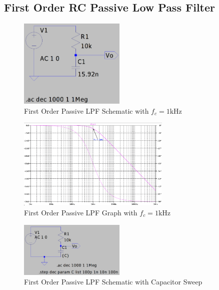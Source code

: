 \documentclass[CMPE]{KGCOEReport}
\begin{document}
\subsection*{First Order RC Passive Low Pass Filter}

\begin{figure}[H]
	\centering
  	\includegraphics[width=0.45\textwidth]{Screenshots/q2_schematic}  
	\caption{First Order Passive LPF Schematic with $f_c = 1 \si{\kilo\hertz}$}
	\label{q2_schematic}
\end{figure}

\begin{figure}[H]
	\centering
  	\includegraphics[width=0.65\textwidth]{Screenshots/q2_graph}  
	\caption{First Order Passive LPF Graph with $f_c = 1 \si{\kilo\hertz}$}
	\label{q2_graph}
\end{figure}

\begin{figure}[H]
	\centering
  	\includegraphics[width=0.45\textwidth]{Screenshots/q3_schematic}  
	\caption{First Order Passive LPF Schematic with Capacitor Sweep}
	\label{q3_schematic}
\end{figure}
\end{document}
